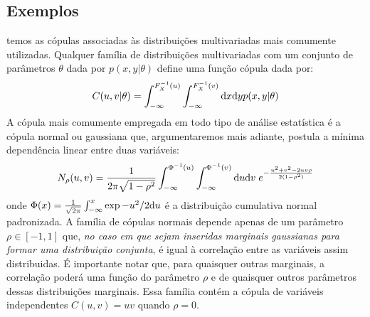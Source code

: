 \subsection{Exemplos}
\label{sec:exemplos}
 temos as cópulas associadas às distribuições multivariadas mais comumente utilizadas. Qualquer família de distribuições multivariadas  com um conjunto de parâmetros $\theta$ dada por $p(x,y |\theta)$ define uma função cópula dada por:
\begin{equation}
\label{eq:generalcopula}
C(u,v|\theta) = \int_{-\infty}^{F_{X}^{-1}(u)} \int_{-\infty}^{F_{X}^{-1}(v)} \ud x \ud y p(x,y|\theta)
\end{equation}
A cópula mais comumente empregada em todo tipo de análise estatística é a cópula normal ou gaussiana que, argumentaremos mais adiante, postula a mínima dependência linear entre duas variáveis:
\begin{equation}
 \label{eq:normalcop}
 N_{\rho}(u,v) = \frac{1}{2\pi\sqrt{1 - \rho^2}}\int_{-\infty}^{\Phi^{-1}(u)} \int_{-\infty}^{\Phi^{-1}(v)} \ud u \ud v\; e^{-\frac{u^2 + v^2 - 2uv\rho}{2(1-\rho^2)}}
\end{equation}
onde $\Phi(x) = \frac{1}{\sqrt{2\pi}}\int_{-\infty}^{x} \exp{-u^2/2} \mathrm{d} u$ é a distribuição cumulativa normal padronizada. A família de cópulas normais depende apenas de um parâmetro $\rho \in [-1,1]$ que, \textit{no caso em que sejam inseridas marginais gaussianas para formar uma distribuição conjunta}, é igual à correlação entre as variáveis assim distribuidas. É importante notar que, para quaisquer outras marginais, a correlação poderá uma função do parâmetro $\rho$ e de quaisquer outros parâmetros dessas distribuições marginais. Essa família contém a cópula de variáveis independentes $C(u,v) = uv$ quando $\rho = 0$.

